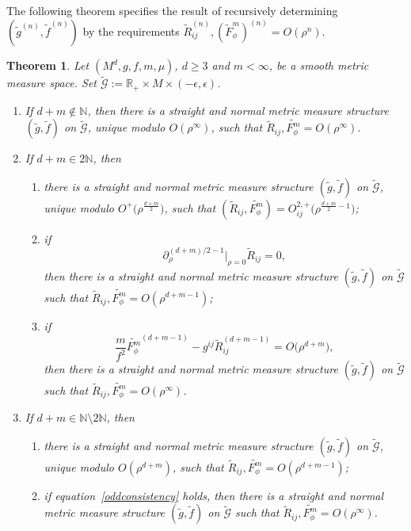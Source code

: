 \documentclass[10pt,a4paper]{amsart}
\numberwithin{equation}{section}
\newtheorem{Theorem}{Theorem}[section]
\begin{document}
The following theorem specifies the result of recursively determining $(\widetilde{g}^{(n)},\widetilde{f}^{(n)})$ by the requirements $\widetilde{R}_{ij}^{(n)},(\widetilde{F}_\phi^m)^{(n)}=O(\rho^n)$.
\begin{Theorem}
\label{various-possibilities}
Let $(M^d,g,f,m,\mu)$, $d\geq 3$ and $m<\infty$, be a smooth metric measure space. Set $\widetilde{\mathcal{G}}:=\mathbb{R}_+\times M\times (-\epsilon,\epsilon)$.
\begin{enumerate}[label=$(\roman*)$]\itemsep=0pt
\item If $d+m\notin\mathbb{N}$, then there is a straight and normal metric measure structure $(\widetilde{g},\widetilde{f})$ on $\widetilde{\mathcal{G}}$, unique modulo $O(\rho^\infty)$, such that $\widetilde{R}_{ij},\widetilde{F_\phi^m}=O(\rho^\infty)$.

\item If $d+m\in 2\mathbb{N}$, then
\begin{enumerate}\itemsep=0pt
\item[$(a)$] there is a straight and normal metric measure structure $(\widetilde{g},\widetilde{f})$ on $\widetilde{\mathcal{G}}$, unique modulo $O^+\big(\rho^{\frac{d+m}{2}}\big)$, such that $(\widetilde{R}_{ij},\widetilde{F_\phi^m})=O_{ij}^{2,+}\big(\rho^{\frac{d+m}{2}-1}\big)$;
\item[$(b)$] if
\[
\partial_\rho^{(d+m)/2-1}\big|_{\rho=0}\widetilde{R}_{ij}=0,
\]
then there is a straight and normal metric measure structure $(\widetilde{g},\widetilde{f})$ on $\widetilde{\mathcal{G}}$ such that $\widetilde{R}_{ij},\widetilde{F_\phi^m}=O(\rho^{d+m-1})$;

\item[$(c)$] if
\begin{equation}\label{oddconsistency}
\frac{m}{f^2} \widetilde{F_\phi^m}^{(d+m-1)}-g^{ij}\widetilde{R}_{ij}^{(d+m-1)}=O\big(\rho^{d+m}\big),
\end{equation}
then there is a straight and normal metric measure structure $(\widetilde{g},\widetilde{f})$ on $\widetilde{\mathcal{G}}$ such that $\widetilde{R}_{ij},\widetilde{F_\phi^m}=O(\rho^\infty)$.
\end{enumerate}

\item If $d+m\in \mathbb{N}\setminus 2\mathbb{N}$, then
\begin{enumerate}\itemsep=0pt
\item[$(a)$] there is a straight and normal metric measure structure $(\widetilde{g},\widetilde{f})$ on $\widetilde{\mathcal{G}}$, unique modulo $O(\rho^{d+m})$, such that $\widetilde{R}_{ij},\widetilde{F_\phi^m}=O(\rho^{d+m-1})$;
\item[$(b)$] if equation~\eqref{oddconsistency} holds, then there is a straight and normal metric measure structure $(\widetilde{g},\widetilde{f})$ on $\widetilde{\mathcal{G}}$ such that $\widetilde{R}_{ij},\widetilde{F_\phi^m}=O(\rho^\infty)$.
\end{enumerate}
\end{enumerate}
\end{Theorem}
\end{document}
